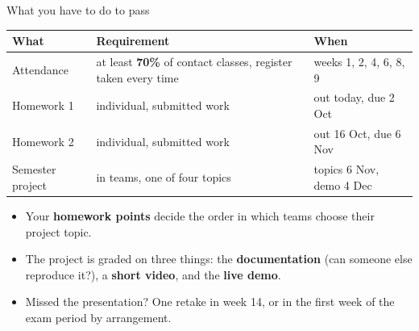 \documentclass[aspectratio=169]{beamer}
\begin{document}
\begin{frame}{What you have to do to pass}
	\begin{center}\small
	\begin{tabular}{p{}p{}p{}}
		\toprule
		\textbf{What} & \textbf{Requirement} & \textbf{When} \\
		\midrule
		Attendance & at least \textbf{70\%} of contact classes, register taken every time & weeks 1, 2, 4, 6, 8, 9 \\
		Homework 1 & individual, submitted work & out today, due 2 Oct \\
		Homework 2 & individual, submitted work & out 16 Oct, due 6 Nov \\[1mm]
		Semester project & in teams, one of four topics & topics 6 Nov, demo 4 Dec \\
		\bottomrule
	\end{tabular}
	\end{center}
	\vspace{2mm}
	\begin{itemize}\footnotesize
		\item Your \textbf{homework points} decide the order in which teams choose their project topic.
		\item The project is graded on three things: the \textbf{documentation} (can someone else reproduce it?), a \textbf{short video}, and the \textbf{live demo}.
		\item Missed the presentation? One retake in week 14, or in the first week of the exam period by arrangement.
	\end{itemize}
\end{frame}
\end{document}
